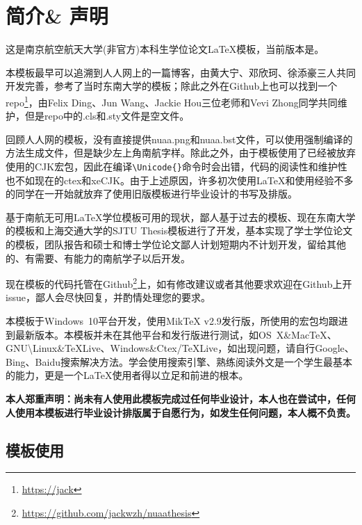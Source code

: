\chapter{简介\& 声明}\label{chap:intro}

这是南京航空航天大学(非官方)本科生学位论文\LaTeX 模板，当前版本是\version 。

本模板最早可以追溯到人人网上的一篇博客\cite{renren}，由黄大宁、邓欣珂、徐添豪三人共同开发完善，参考了当时东南大学的\seuthesix 模板；除此之外在Github上也可以找到一个repo\footnote{\url{https://jack}}{\footnotesize}，由Felix Ding、Jun Wang、Jackie Hou三位老师和Vevi Zhong同学共同维护，但是repo中的.cls和.sty文件是空文件。

回顾人人网的模板，没有直接提供nuaa.png和nuaa.bst文件，可以使用强制编译的方法生成文件，但是缺少左上角南航字样。除此之外，由于模板使用了已经被放弃使用的CJK宏包，因此在编译\verb+\Unicode{}+命令时会出错，代码的阅读性和维护性也不如现在的ctex和xeCJK。由于上述原因，许多初次使用\LaTeX 和使用经验不多的同学在一开始就放弃了使用旧版模板进行毕业设计的书写及排版。

基于南航无可用\LaTeX 学位模板可用的现状，鄙人基于过去的\oldnuaathesis 模板、现在东南大学的\seuthesix 模板和上海交通大学的SJTU Thesis模板进行了开发，基本实现了学士学位论文的模板，团队报告和硕士和博士学位论文鄙人计划短期内不计划开发，留给其他的、有需要、有能力的南航学子以后开发。

现在\nuaathesis 模板的代码托管在Github\footnote{\url{https://github.com/jackwzh/nuaathesis}}上，如有修改建议或者其他要求欢迎在Github上开issue，鄙人会尽快回复，并酌情处理您的要求。

本模板于Windows~10平台开发，使用MikTeX v2.9发行版，所使用的宏包均跟进到最新版本。本模板并未在其他平台和发行版进行测试，如OS~X\&MacTeX、GNU\textbackslash Linux\&TeXLive、Windows\&Ctex/TeXLive，如出现问题，请自行Google、Bing、Baidu搜索解决方法。学会使用搜索引擎、熟练阅读外文是一个学生最基本的能力，更是一个\LaTeX 使用者得以立足和前进的根本。

\textbf{本人郑重声明：尚未有人使用此模板完成过任何毕业设计，本人也在尝试中，任何人使用本模板进行毕业设计排版属于自愿行为，如发生任何问题，本人概不负责。}

\section{模板使用}
